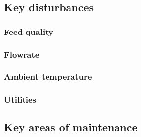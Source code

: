 \subsection{Key disturbances} %

\subsubsection{Feed quality}

\subsubsection{Flowrate}

\subsubsection{Ambient temperature}

\subsubsection{Utilities}


\subsection{Key areas of maintenance} %